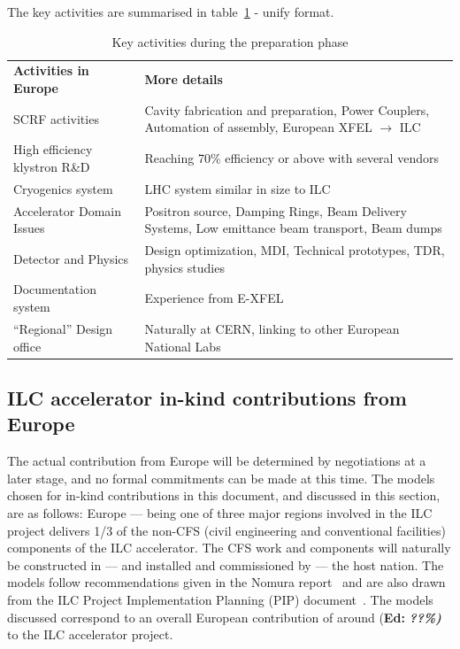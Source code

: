\documentclass[%
 reprint,
 amsmath,amssymb,
 aps,
]{revtex4-1}
\newif\ifEdNotes \EdNotestrue
\newcommand{\doednote}[1]{{\color{red}(\textbf{Ed:} \textit{#1)}}}
\newcommand{\ednote}[1]{\ifEdNotes 
  \doednote{#1} 
\fi}
\begin{document}
The key activities are summarised in table~\ref{fig:prep-phase-summary} - unify format.




\begin{table}[htbp]
\begin{ruledtabular}
\begin{tabular}{p{3.5cm}p{4.75cm}}
 \bfseries {Activities in Europe} &\bfseries{More details}                                                         \\
SCRF activities			&Cavity fabrication and preparation, Power Couplers, Automation of assembly, European XFEL $\rightarrow$ ILC\\
High efficiency klystron R\&D   &Reaching 70\% efficiency or above with several vendors   \\
Cryogenics system               &LHC system similar in size to ILC\\
Accelerator Domain Issues       &Positron source, Damping Rings, Beam Delivery Systems, Low emittance beam transport, Beam dumps\\
Detector and Physics            &Design optimization, MDI, Technical prototypes, TDR, physics studies\\
Documentation system            &Experience from E-XFEL                                       \\
“Regional” Design office        &Naturally at CERN, linking to other European National Labs \\
\end{tabular}
\end{ruledtabular}
\caption{\label{fig:prep-phase-summary} Key activities during the preparation phase}
\end{table}


\subsection{ILC accelerator in-kind contributions from Europe ~\label{sec:acc:constrphase}}

The actual contribution from Europe will be determined by negotiations at a 
later stage, and no formal commitments can be made at this time. The models 
chosen for in-kind contributions in this document, and discussed in this 
section, are as follows: Europe — being one of three major regions involved in 
the ILC project delivers 1/3 of the non-CFS (civil engineering and conventional facilities) 
components of the ILC accelerator. The CFS work 
and components will naturally be constructed in — and installed and 
commissioned by — the host nation. The models follow recommendations given in 
the Nomura report~\cite{Nomura-eng} and are also drawn from the ILC Project Implementation 
Planning (PIP) document~\cite{ILCPIP}. The models discussed correspond to an overall 
European contribution of around \ednote{\bfseries ??\%} to the ILC accelerator project. 
\end{document}
